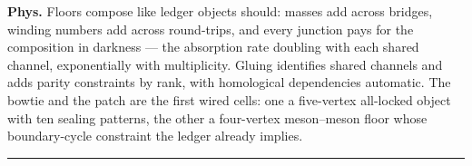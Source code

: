 \begin{theorem}
\textbf{Phys.} Floors compose like ledger objects should: masses add across bridges, winding numbers add across round-trips, and every junction pays for the composition in darkness — the absorption rate doubling with each shared channel, exponentially with multiplicity. Gluing identifies shared channels and adds parity constraints by rank, with homological dependencies automatic. The bowtie and the patch are the first wired cells: one a five-vertex all-locked object with ten sealing patterns, the other a four-vertex meson–meson floor whose boundary-cycle constraint the ledger already implies.

\vspace{2pt}\noindent\rule{\textwidth}{0.4pt}\vspace{2pt}

\end{theorem}

